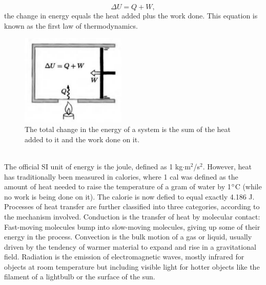 \documentclass[11pt]{exam}
\begin{document}
\begin{equation}\tag{1.24}
\Delta U = Q + W,    
\end{equation}
the change in energy equals the heat added plus the work done. This equation is known as the first law of thermodynamics. 
\begin{figure}[htp]
    \centering
    \includegraphics[width=5cm]{figure4.png}
    \caption{The total change in the energy of a system is the sum of the heat added to it and the work done on it.}
\label{fig:first_law}
\end{figure}\\
\hspace*{10mm}The official SI unit of energy is the joule, defined as 1 kg$\cdot$m$^2$/s$^2$. However, heat has traditionally been measured in calories, where 1 cal was defined as the amount of heat needed to raise the temperature of a gram of water by 1$\degree$C (while no work is being done on it). The calorie is now defied to equal exactly 4.186 J. \\
\hspace*{10mm}Processes of heat transfer are further classified into three categories, according to the mechanism involved. Conduction is the transfer of heat by molecular contact: Fast-moving molecules bump into slow-moving molecules, giving up some of their energy in the process. Convection is the bulk motion of a gas or liquid, usually driven by the tendency of warmer material to expand and rise in a gravitational field. Radiation is the emission of electromagnetic waves, mostly infrared for objects at room temperature but including visible light for hotter objects like the filament of a lightbulb or the surface of the sun. 
\newpage
\end{document}
